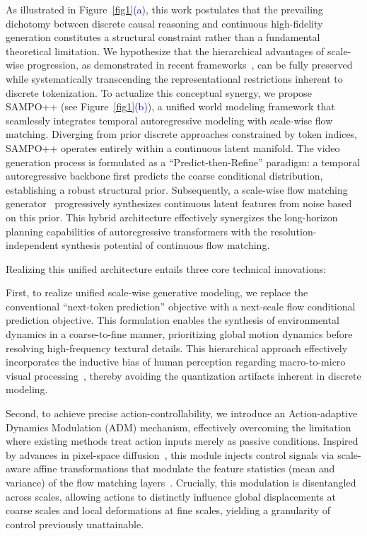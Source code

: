 As illustrated in Figure~\ref{fig1}\textcolor{blue}{(a)}, this work postulates that the prevailing dichotomy between discrete causal reasoning and continuous high-fidelity generation constitutes a structural constraint rather than a fundamental theoretical limitation. We hypothesize that the hierarchical advantages of scale-wise progression, as demonstrated in recent frameworks~\cite{wang2025sampo,tian2024visual,li2024autoregressive}, can be fully preserved while systematically transcending the representational restrictions inherent to discrete tokenization.
To actualize this conceptual synergy, we propose SAMPO++ (see Figure~\ref{fig1}\textcolor{blue}{(b)}), a unified world modeling framework that seamlessly integrates temporal autoregressive modeling with scale-wise flow matching. Diverging from prior discrete approaches constrained by token indices, SAMPO++ operates entirely within a continuous latent manifold. The video generation process is formulated as a ``Predict-then-Refine'' paradigm: a temporal autoregressive backbone first predicts the coarse conditional distribution, establishing a robust structural prior. Subsequently, a scale-wise flow matching generator~\cite{ren2024flowar, ma2024sit} progressively synthesizes continuous latent features from noise based on this prior. This hybrid architecture effectively synergizes the long-horizon planning capabilities of autoregressive transformers with the resolution-independent synthesis potential of continuous flow matching.

Realizing this unified architecture entails three core technical innovations:

First, to realize unified scale-wise generative modeling, we replace the conventional ``next-token prediction'' objective with a next-scale flow conditional prediction objective. This formulation enables the synthesis of environmental dynamics in a coarse-to-fine manner, prioritizing global motion dynamics before resolving high-frequency textural details. This hierarchical approach effectively incorporates the inductive bias of human perception regarding macro-to-micro visual processing~\cite{denton2015deep}, thereby avoiding the quantization artifacts inherent in discrete modeling.

Second, to achieve precise action-controllability, we introduce an Action-adaptive Dynamics Modulation (ADM) mechanism, effectively overcoming the limitation where existing methods treat action inputs merely as passive conditions. Inspired by advances in pixel-space diffusion~\cite{yu2025pixeldit}, this module injects control signals via scale-aware affine transformations that modulate the feature statistics (mean and variance) of the flow matching layers~\cite{park2019spade, karras2019stylegan2}. Crucially, this modulation is disentangled across scales, allowing actions to distinctly influence global displacements at coarse scales and local deformations at fine scales, yielding a granularity of control previously unattainable.

